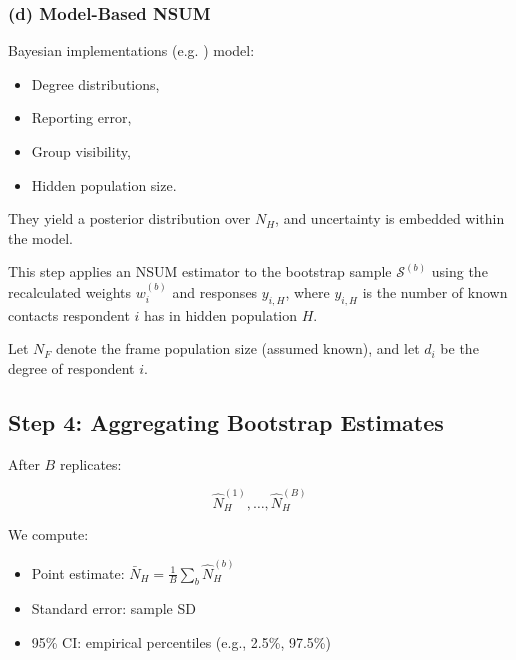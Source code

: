 \documentclass[
  12pt,
  letterpaper,
  DIV=11,
  numbers=noendperiod]{scrartcl}
\theoremstyle{plain}
\theoremstyle{definition}
\begin{document}
\subsubsection{(d) Model-Based NSUM}\label{d-model-based-nsum}

Bayesian implementations (e.g. \textcite{malt15-estimating}) model:

\begin{itemize}
\item
  Degree distributions,
\item
  Reporting error,
\item
  Group visibility,
\item
  Hidden population size.
\end{itemize}

They yield a posterior distribution over \(N_H\), and uncertainty is
embedded within the model.

This step applies an NSUM estimator to the bootstrap sample
\(\mathcal{S}^{(b)}\) using the recalculated weights \(w_i^{(b)}\) and
responses \(y_{i,H}\), where \(y_{i,H}\) is the number of known contacts
respondent \(i\) has in hidden population \(H\).

Let \(N_F\) denote the frame population size (assumed known), and let
\(d_i\) be the degree of respondent \(i\).

\subsection{Step 4: Aggregating Bootstrap
Estimates}\label{step-4-aggregating-bootstrap-estimates}

After \(B\) replicates:

\[\hat{N}_H^{(1)}, \dots, \hat{N}_H^{(B)}\]

We compute:

\begin{itemize}
\item
  Point estimate: \(\bar{N}_H = \frac{1}{B} \sum_b \hat{N}_H^{(b)}\)
\item
  Standard error: sample SD
\item
  95\% CI: empirical percentiles (e.g., 2.5\%, 97.5\%)
\end{itemize}
\end{document}
